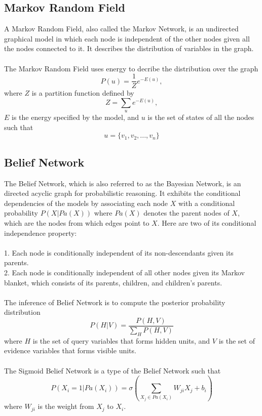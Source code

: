 \documentclass[12pt]{article}
\begin{document}
\subsection{Markov Random Field}
A Markov Random Field, also called the Markov Network, is an undirected graphical model in which each node is independent of the other nodes given all the nodes connected to it. It describes the distribution of variables in the graph.\\
\\
The Markov Random Field uses energy to decribe the distribution over the graph\begin{equation}
P(u) = \frac{1}{Z} e^{-E(u)},
\end{equation}
where $Z$ is a partition function defined by \begin{equation}
Z = \sum_{u} e^{-E(u)},
\end{equation}
$E$ is the energy specified by the model, and $u$ is the set of states of all the nodes such that \begin{equation}
u=\{v_1, v_2,...,v_n \}
\end{equation}
\subsection{Belief Network}
The Belief Network, which is also referred to as the Bayesian Network, is an directed acyclic graph for probabilistic reasoning. It exhibits the conditional dependencies of the models by associating each node $X$ with a conditional probability $P(X|Pa(X))$ where $Pa(X)$ denotes the parent nodes of $X$, which are the nodes from which edges point to $X$. Here are two of its conditional independence property:\\
\\
1. Each node is conditionally independent of its non-descendants given its parents.\\
2. Each node is conditionally independent of all other nodes given its Markov blanket, which consists of its parents, children, and children's parents.\\
\\
The inference of Belief Network is to compute the posterior probability distribution\begin{equation}
P(H|V) = \frac{P(H, V)}{\sum_H P(H,V)}
\end{equation}
where $H$ is the set of query variables that forms hidden units, and $V$ is the set of evidence variables that forms visible units.\\
\\
The Sigmoid Belief Network is a type of the Belief Network such that \begin{equation}
P(X_i=1|Pa(X_i)) = \sigma(\sum_{X_j\in Pa(X_i)} W_{ji} X_j + b_i)
\end{equation}
where $W_{ji}$ is the weight from $X_j$ to $X_i$. 
\end{document}
